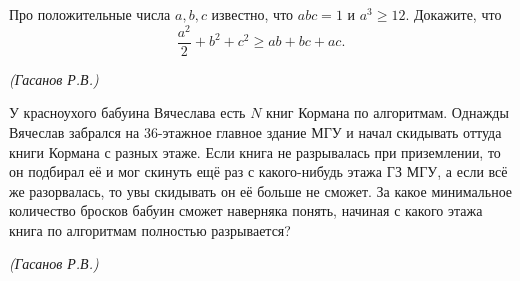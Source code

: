 \newpage

\hspace{3mm}

Про положительные числа $a, b, c$ известно, что $abc = 1$ и $a^3 \geq 12$. Докажите, что
\[\dfrac{a^2}{2} + b^2 + c^2 \geq ab + bc + ac.\]

\begin{flushright}
    \textit{\small{(Гасанов Р.В.)}}
\end{flushright}

У красноухого бабуина Вячеслава есть $N$ книг Кормана по алгоритмам. Однажды Вячеслав забрался на 36-этажное главное здание МГУ и начал скидывать оттуда книги Кормана с разных этаже. Если книга не разрывалась при приземлении, то он подбирал её и мог скинуть ещё раз с какого-нибудь этажа ГЗ МГУ, а если всё же разорвалась, то увы скидывать он её больше не сможет. За какое минимальное количество бросков бабуин сможет наверняка понять, начиная с какого этажа книга по алгоритмам полностью разрывается?
\begin{flushright}
    \textit{\small{(Гасанов Р.В.)}}
\end{flushright}